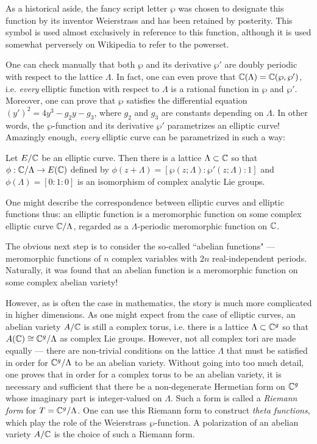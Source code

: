 As a historical aside, the fancy script letter $\wp$ was chosen to designate this function by its inventor Weierstrass and has been retained by posterity. This symbol is used almost exclusively in reference to this function, although it is used somewhat perversely on Wikipedia to refer to the powerset.

One can check manually that both $\wp$ and its derivative $\wp'$ are doubly periodic with respect to the lattice $\Lambda$. In fact, one can even prove that $\mathbb{C}(\Lambda)=\mathbb{C}(\wp,\wp')$, i.e. \emph{every} elliptic function with respect to $\Lambda$ is a rational function in $\wp$ and $\wp'$. Moreover, one can prove that $\wp$ satisfies the differential equation $(y')^2 = 4y^3-g_2y-g_3$, where $g_2$ and $g_3$ are constants depending on $\Lambda$. In other words, the $\wp$-function and its derivative $\wp'$ parametrizes an elliptic curve! Amazingly enough, \emph{every} elliptic curve can be parametrized in such a way:

\begin{theorem}
\label{uniformization}
Let $E/\mathbb{C}$ be an elliptic curve. Then there is a lattice $\Lambda\subset \mathbb{C}$ so that $\phi:\mathbb{C}/\Lambda\rightarrow E(\mathbb{C})$ defined by $\phi(z+\Lambda)=[\wp(z;\Lambda):\wp'(z;\Lambda):1]$ and $\phi(\Lambda) = [0:1:0]$ is an isomorphism of complex analytic Lie groups.
\end{theorem}

One might describe the correspondence between elliptic curves and elliptic functions thus: an elliptic function is a meromorphic function on some complex elliptic curve $\mathbb{C}/\Lambda$, regarded as a $\Lambda$-periodic meromorphic function on $\mathbb{C}$.

The obvious next step is to consider the so-called ``abelian functions" --- meromorphic functions of $n$ complex variables with $2n$ real-independent periods. Naturally, it was found that an abelian function is a meromorphic function on some complex abelian variety!

However, as is often the case in mathematics, the story is much more complicated in higher dimensions. As one might expect from the case of elliptic curves, an abelian variety $A/\mathbb{C}$ is still a complex torus, i.e. there is a lattice $\Lambda\subset \mathbb{C}^g$ so that $A(\mathbb{C})\cong \mathbb{C}^g/\Lambda$ as complex Lie groups. However, not all complex tori are made equally --- there are non-trivial conditions on the lattice $\Lambda$ that must be satisfied in order for $\mathbb{C}^g/\Lambda$ to be an abelian variety. Without going into too much detail, one proves that in order for a complex torus to be an abelian variety, it is necessary and sufficient that there be a non-degenerate Hermetian form on $\mathbb{C}^g$ whose imaginary part is integer-valued on $\Lambda$. Such a form is called a \emph{Riemann form} for $T=\mathbb{C}^g/\Lambda$. One can use this Riemann form to construct \emph{theta functions}, which play the role of the Weierstrass $\wp$-function. A polarization of an abelian variety $A/\mathbb{C}$ is the choice of such a Riemann form.


